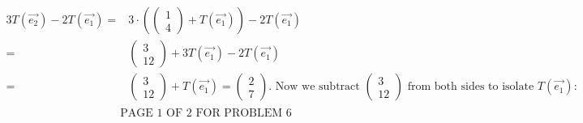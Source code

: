 \documentclass[12pt]{article}
\newenvironment{problem}[2][Problem]
{
	\begin{trivlist} 
		\item[\hskip \labelsep {\bfseries #1 #2:}]
	}
{
	\end{trivlist}
	}
\newenvironment{solution}[1][Solution]
{
	\begin{trivlist} 
		\item[\hskip \labelsep {\itshape #1:}]
	}
	{
	\end{trivlist}
}
\begin{document}
\begin{problem}{6}
\begin{solution}
\begin{align*}
3T(\vec{e_{2}}) - 2 T(\vec{e_{1}}) =& 3\cdot \left(\begin{pmatrix}1\\4\end{pmatrix}+T(\vec{e_{1}})\right)- 2 T(\vec{e_{1}}) &\\
=& \begin{pmatrix}3\\12\end{pmatrix} + 3T(\vec{e_{1}}) - 2 T(\vec{e_{1}}) &\\
=& \begin{pmatrix}3\\12\end{pmatrix} + T(\vec{e_{1}}) = \begin{pmatrix}2\\7\end{pmatrix}\text{.} \text{ Now we subtract $\begin{pmatrix}3\\12\end{pmatrix}$ from both sides to isolate $T(\vec{e_{1}})$:} &\\
\end{align*}
\[
\text{PAGE 1 OF 2 FOR PROBLEM 6}
\]
\end{solution}









\end{problem}
\end{document}
